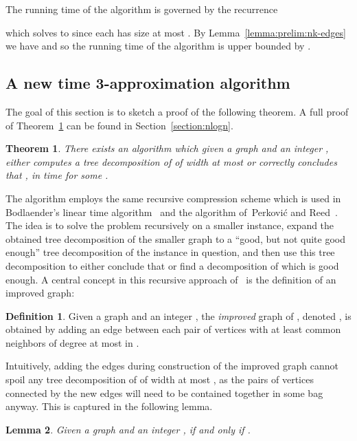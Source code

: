 \documentclass[a4paper,11pt]{article}
\newtheorem{theorem}{Theorem}
\newtheorem{lemma}{Lemma}[section]
\theoremstyle{definition}
\newtheorem{definition}[lemma]{Definition}
\theoremstyle{remark}
\begin{document}
The running time of the algorithm is governed by the recurrence

which solves to  since each  has
size at most .  By Lemma~\ref{lemma:prelim:nk-edges} we
have  and so the running time of the algorithm is upper
bounded by .




\subsection{A new  time 3-approximation
  algorithm}\label{sec:recursiveScheme}
The goal of this section is to sketch a proof of the following
theorem.  A full proof of Theorem~\ref{theorem:nlogn} can be found in
Section~\ref{section:nlogn}.
\begin{theorem}
  \label{theorem:nlogn}
  There exists an algorithm which given a graph  and an integer
  , either computes a tree decomposition of  of width at most
   or correctly concludes that , in time
   for some .
\end{theorem}

The algorithm employs the same recursive compression scheme which is
used in Bodlaender's linear time
algorithm~\cite{Bodlaender93s,Bodlaender96} and the algorithm
of~Perkovi{\'{c}} and Reed~\cite{PerkovicR00}.  The idea is to solve
the problem recursively on a smaller instance, expand the obtained
tree decomposition of the smaller graph to a ``good, but not quite
good enough'' tree decomposition of the instance in question, and then
use this tree decomposition to either conclude that  or
find a decomposition of  which is good enough.  A central concept
in this recursive approach of~\cite{Bodlaender96} is the definition of
an improved graph:


\begin{definition}\label{def:prelim:improved-graph}
  Given a graph  and an integer , the \emph{improved}
  graph of , denoted , is obtained by adding an edge between
  each pair of vertices with at least  common neighbors of degree
  at most  in .
\end{definition}

Intuitively, adding the edges during construction of the improved
graph cannot spoil any tree decomposition of  of width at most ,
as the pairs of vertices connected by the new edges will need to be
contained together in some bag anyway.  This is captured in the
following lemma.

\begin{lemma}
  \label{lem:improvedGraphTw}
  Given a graph  and an integer ,  if
  and only if .
\end{lemma}
\end{document}
